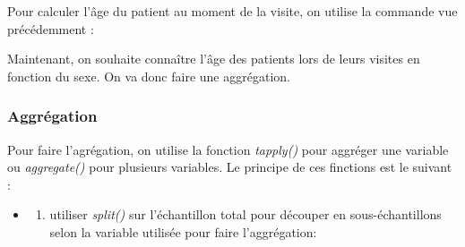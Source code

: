\documentclass[
]{book}
\newenvironment{Shaded}{\begin{snugshade}}{\end{snugshade}}
\newcommand{\AttributeTok}[1]{\textcolor[rgb]{0.77,0.63,0.00}{#1}}
\newcommand{\DecValTok}[1]{\textcolor[rgb]{0.00,0.00,0.81}{#1}}
\newcommand{\FunctionTok}[1]{\textcolor[rgb]{0.00,0.00,0.00}{#1}}
\newcommand{\NormalTok}[1]{#1}
\newcommand{\OtherTok}[1]{\textcolor[rgb]{0.56,0.35,0.01}{#1}}
\newcommand{\SpecialCharTok}[1]{\textcolor[rgb]{0.00,0.00,0.00}{#1}}
\newcommand{\StringTok}[1]{\textcolor[rgb]{0.31,0.60,0.02}{#1}}
\providecommand{\tightlist}{%
  \setlength{\itemsep}{0pt}\setlength{\parskip}{0pt}}
\theoremstyle{definition}
\theoremstyle{definition}
\theoremstyle{definition}
\theoremstyle{definition}
\theoremstyle{remark}
\begin{document}
Pour calculer l'âge du patient au moment de la visite, on utilise la commande vue précédemment :

\begin{Shaded}
\end{Shaded}

Maintenant, on souhaite connaître l'âge des patients lors de leurs visites en fonction du sexe. On va donc faire une aggrégation.

\hypertarget{aggruxe9gation}{%
\subsubsection{Aggrégation}\label{aggruxe9gation}}

Pour faire l'agrégation, on utilise la fonction \emph{tapply()} pour aggréger une variable ou \emph{aggregate()} pour plusieurs variables. Le principe de ces finctions est le suivant :

\begin{itemize}
\item
  \begin{enumerate}
  \def\labelenumi{\arabic{enumi}.}
  \tightlist
  \item
    utiliser \emph{split()} sur l'échantillon total pour découper en sous-échantillons selon la variable utilisée pour faire l'aggrégation:
  \end{enumerate}
\end{itemize}

\begin{Shaded}
\end{Shaded}
\end{document}
